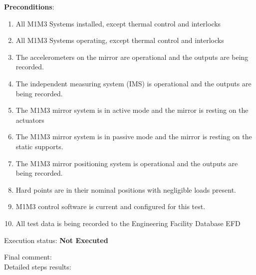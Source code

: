 \documentclass[SE,lsstdraft,STR,toc]{lsstdoc}
\providecommand{\tightlist}{
  \setlength{\itemsep}{0pt}\setlength{\parskip}{0pt}}
\begin{document}
\textbf{ Preconditions}:\\
\begin{enumerate}
\tightlist
\item
  All M1M3 Systems installed, except thermal control and interlocks
\item
  All M1M3 Systems operating, except thermal control and interlocks
\item
  The accelerometers on the mirror are operational and the outputs are
  being recorded.
\item
  The independent measuring system (IMS) is operational and the outputs
  are being recorded.
\item
  The M1M3 mirror system is in active mode and the mirror is resting on
  the actuators
\item
  The M1M3 mirror system is in passive mode and the mirror is resting on
  the static supports.
\item
  The M1M3 mirror positioning system is operational and the outputs are
  being recorded.
\item
  Hard points are in their nominal positions with negligible loads
  present.
\item
  M1M3 control software is current and configured for this test.
\item
  All test data is being recorded to the Engineering Facility Database
  EFD
\end{enumerate}

Execution status: {\bf Not Executed }

Final comment:\\


Detailed steps results:
\end{document}
